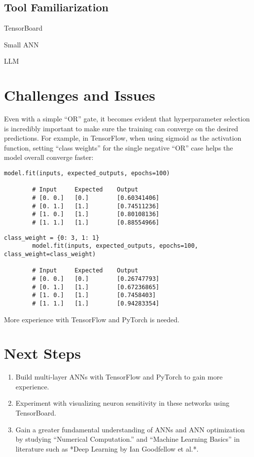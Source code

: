 \documentclass{article}
\begin{document}
    \subsection*{Tool Familiarization}
    TensorBoard

    Small ANN

    LLM


    \section*{Challenges and Issues}
    Even with a simple ``OR'' gate, it becomes evident that hyperparameter selection is incredibly important to make
    sure the training can converge on the desired predictions.
    For example, in TensorFlow, when using sigmoid as the activation function, setting ``class weights'' for the single
    negative ``OR'' case helps the model overall converge faster:

    \begin{lstlisting}[caption=Without class weights]
        model.fit(inputs, expected_outputs, epochs=100)

        # Input     Expected	Output
        # [0. 0.]   [0.]        [0.60341406]
        # [0. 1.]   [1.]        [0.74511236]
        # [1. 0.]   [1.]        [0.80108136]
        # [1. 1.]   [1.]        [0.88554966]
    \end{lstlisting}

    \begin{lstlisting}[caption=With class weights]
        class_weight = {0: 3, 1: 1}
        model.fit(inputs, expected_outputs, epochs=100, class_weight=class_weight)

        # Input	    Expected	Output
        # [0. 0.]	[0.]	    [0.26747793]
        # [0. 1.]	[1.]	    [0.67236865]
        # [1. 0.]	[1.]	    [0.7458403]
        # [1. 1.]	[1.]	    [0.94283354]
    \end{lstlisting}

    More experience with TensorFlow and PyTorch is needed.

    \section*{Next Steps}
    \begin{enumerate}
        \item Build multi-layer ANNs with TensorFlow and PyTorch to gain more experience.
        \item Experiment with visualizing neuron sensitivity in these networks using TensorBoard\cite{tensorboard_2024}.
        \item Gain a greater fundamental understanding of ANNs and ANN optimization by studying ``Numerical Computation.''
        and ``Machine Learning Basics'' in literature such as *Deep Learning by Ian Goodfellow et al.*\cite{Goodfellow-et-al-2016}.
    \end{enumerate}
\end{document}
